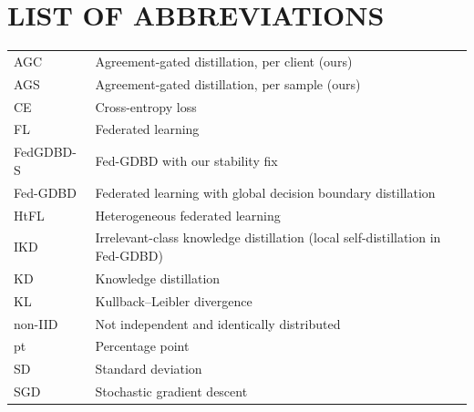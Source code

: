 \documentclass[12pt,a4paper,oneside,openany]{report}
\numberwithin{equation}{chapter}
\begin{document}
\chapter*{LIST OF ABBREVIATIONS}
\begin{tabular}{@{}p{3.2cm}p{10.5cm}@{}}
AGC & Agreement-gated distillation, per client (ours)\\
AGS & Agreement-gated distillation, per sample (ours)\\
CE & Cross-entropy loss\\
FL & Federated learning\\
FedGDBD-S & Fed-GDBD with our stability fix\\
Fed-GDBD & Federated learning with global decision boundary distillation \cite{zhang2025gdbd}\\
HtFL & Heterogeneous federated learning\\
IKD & Irrelevant-class knowledge distillation (local self-distillation in Fed-GDBD)\\
KD & Knowledge distillation\\
KL & Kullback--Leibler divergence\\
non-IID & Not independent and identically distributed\\
pt & Percentage point\\
SD & Standard deviation\\
SGD & Stochastic gradient descent\\
\end{tabular}

\clearpage
{}
\setcounter{page}{1}







\clearpage
{}


\appendix

\end{document}
